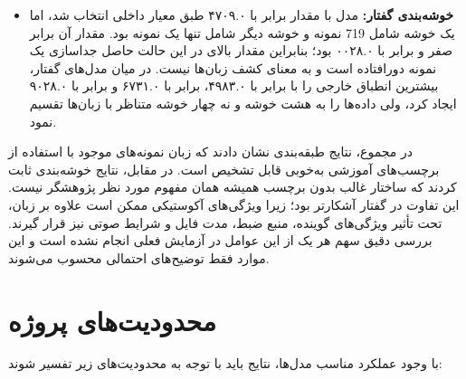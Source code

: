 \documentclass[12pt,a4paper,oneside]{report}
\begin{document}
\begin{itemize}
	\item \textbf{خوشه‌بندی گفتار:}
	مدل
	با مقدار
	برابر با ۴۷۰۹.۰ طبق معیار داخلی انتخاب شد، اما یک خوشه شامل 719 نمونه و خوشه دیگر شامل تنها یک نمونه بود. مقدار
	آن برابر صفر و
	برابر با ۰۰۲۸.۰ بود؛ بنابراین مقدار بالای
	در این حالت حاصل جداسازی یک نمونه دورافتاده است و به معنای کشف زبان‌ها نیست. در میان مدل‌های گفتار،
	بیشترین انطباق خارجی را با
	برابر با ۴۹۸۳.۰،
	برابر با ۶۷۳۱.۰ و
	برابر با ۹۰۲۸.۰ ایجاد کرد، ولی داده‌ها را به هشت خوشه و نه چهار خوشه متناظر با زبان‌ها تقسیم نمود.
\end{itemize}

در مجموع، نتایج طبقه‌بندی نشان دادند که زبان نمونه‌های موجود با استفاده از برچسب‌های آموزشی به‌خوبی قابل تشخیص است. در مقابل، نتایج خوشه‌بندی ثابت کردند که ساختار غالب بدون برچسب همیشه همان مفهوم مورد نظر پژوهشگر نیست. این تفاوت در گفتار آشکارتر بود؛ زیرا ویژگی‌های آکوستیکی ممکن است علاوه بر زبان، تحت تأثیر ویژگی‌های گوینده، منبع ضبط، مدت فایل و شرایط صوتی نیز قرار گیرند. بررسی دقیق سهم هر یک از این عوامل در آزمایش فعلی انجام نشده است و این موارد فقط توضیح‌های احتمالی محسوب می‌شوند.


\section{محدودیت‌های پروژه}

با وجود عملکرد مناسب مدل‌ها، نتایج باید با توجه به محدودیت‌های زیر تفسیر شوند:
\end{document}
